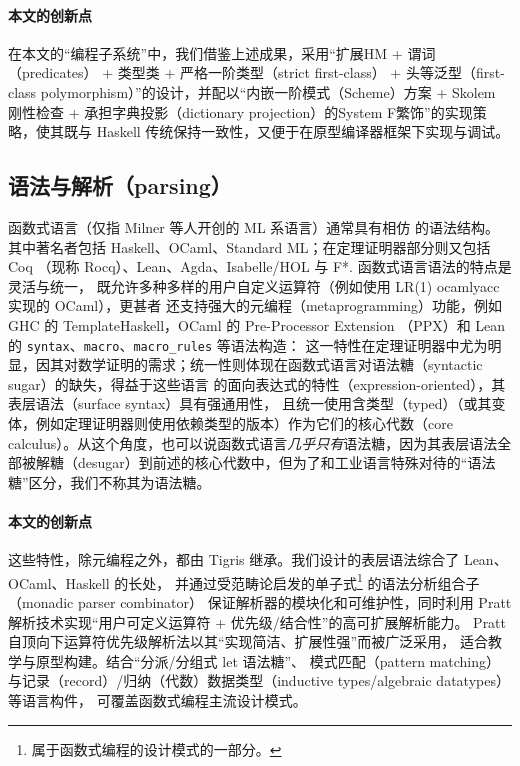 \paragraph{本文的创新点} 在本文的“编程子系统”中，我们借鉴上述成果，采用“扩展HM + 谓词（predicates） + 类型类 + 严格一阶类型（strict first-class） + 头等泛型（first-class polymorphism）”的设计，并配以“内嵌一阶模式（Scheme）方案 + Skolem 刚性检查 + 承担字典投影（dictionary projection）的System F繁饰”的实现策略，使其既与 Haskell 传统保持一致性，又便于在原型编译器框架下实现与调试。

\subsection{语法与解析（parsing）} 函数式语言（仅指 Milner 等人开创的 ML 系语言）通常具有相仿
的语法结构。其中著名者包括 Haskell、OCaml、Standard ML；在定理证明器部分则又包括 Coq （现称 Rocq）、Lean、Agda、Isabelle/HOL 与 F*. 函数式语言语法的特点是灵活与统一，
既允许多种多样的用户自定义运算符（例如使用 LR(1) ocamlyacc 实现的 OCaml），更甚者
还支持强大的元编程（metaprogramming）功能，例如 GHC 的 TemplateHaskell，OCaml 的 Pre-Processor Extension （PPX）和 Lean 的 \texttt{syntax}、\texttt{macro}、\texttt{macro\_rules} 等语法构造：
这一特性在定理证明器中尤为明显，因其对数学证明的需求；统一性则体现在函数式语言对语法糖（syntactic sugar）的缺失，得益于这些语言
的面向表达式的特性（expression-oriented），其表层语法（surface syntax）具有强通用性，
且统一使用含类型（typed）\lambdacalc（或其变体，例如定理证明器则使用依赖类型的版本）作为它们的核心代数（core calculus）。从这个角度，也可以说函数式语言\emph{几乎只有}语法糖，因为其表层语法全部被解糖（desugar）到前述的核心代数中，但为了和工业语言特殊对待的“语法糖”区分，我们不称其为语法糖。

\paragraph{本文的创新点} 这些特性，除元编程之外，都由 Tigris 继承。我们设计的表层语法综合了 Lean、OCaml、Haskell 的长处，
并通过受范畴论启发的单子式\footnote{属于函数式编程的设计模式的一部分。}
的语法分析组合子（monadic parser combinator）
保证解析器的模块化和可维护性，同时利用 Pratt 解析技术实现“用户可定义运算符 + 优先级/结合性”的高可扩展解析能力。
Pratt 自顶向下运算符优先级解析法以其“实现简洁、扩展性强”而被广泛采用，
适合教学与原型构建。结合“分派/分组式 let 语法糖”、
模式匹配（pattern matching）与记录（record）/归纳（代数）数据类型（inductive types/algebraic datatypes）等语言构件，
可覆盖函数式编程主流设计模式。

